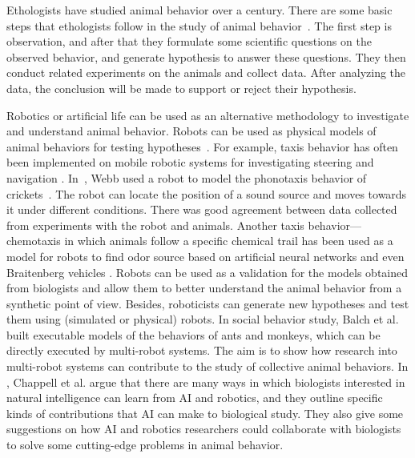 Ethologists have studied animal behavior over a century. There are some basic steps that ethologists follow in the study of animal behavior~\cite{camazine2003self}. The first step is observation, and after that they formulate some scientific questions on the observed behavior, and generate hypothesis to answer these questions. They then conduct related experiments on the animals and collect data. After analyzing the data, the conclusion will be made to support or reject their hypothesis.

Robotics or artificial life can be used as an alternative methodology to investigate and understand animal behavior. Robots can be used as physical models of animal behaviors for testing hypotheses~\citep{Barbara_2000, Meyer2008}. For example, taxis behavior has often been implemented on mobile robotic systems for investigating steering and navigation \cite{Ignacio2009}. In~\citep{Barbara_1995}, Webb used a robot to model the phonotaxis behavior of crickets~\citep{Popov:JCP:1997}. The robot can locate the position of a sound source and moves towards it under different conditions. There was good agreement between data collected from experiments with the robot and animals. Another taxis behavior---chemotaxis in which animals follow a specific chemical trail has been used as a model for robots to find odor source based on artificial neural networks \cite{Farah_2002} and even Braitenberg vehicles \cite{Lilienthal_2003}. Robots can be used as a validation for the models obtained from biologists and allow them to better understand the animal behavior from a synthetic point of view. Besides, roboticists can generate new hypotheses and test them using (simulated or physical) robots. In social behavior study, Balch et al.~\citep{Balch_2006} built executable models of the behaviors of ants and monkeys, which can be directly executed by multi-robot systems. The aim is to show how research into multi-robot systems can contribute to the study of collective animal behaviors. In \cite{Chappell_2010}, Chappell et al. argue that there are many ways in which biologists interested in natural intelligence can learn from AI and robotics, and they outline specific kinds of contributions that AI can make to biological study. They also give some suggestions on how AI and robotics researchers could collaborate with biologists to solve some cutting-edge problems in animal behavior.


